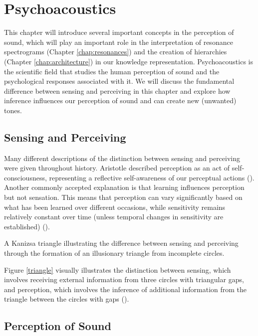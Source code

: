 \chapter{Psychoacoustics}
\label{chap:Psychoacoustics}
This chapter will introduce several important concepts in the perception of sound, which will play an important role in the interpretation of resonance spectrograms (Chapter \ref{chap:resonances}) and the creation of hierarchies (Chapter \ref{chap:architecture}) in our knowledge representation. 
Psychoacoustics is the scientific field that studies the human perception of sound and the psychological responses associated with it. We will discuss the fundamental difference between sensing and perceiving in this chapter and explore how inference influences our perception of sound and can create new (unwanted) tones.


\section{Sensing and Perceiving}
Many different descriptions of the distinction between sensing and perceiving were given throughout history.
Aristotle described perception as an act of self-consciousness, representing a reflective self-awareness of our perceptual actions (\cite{kosman_perceiving_1975}).
Another commonly accepted explanation is that learning influences perception but not sensation. This means that perception can vary significantly based on what has been learned over different occasions, while sensitivity remains relatively constant over time (unless temporal changes in sensitivity are established) (\cite{obrien_epistemology_nodate}).  
\begin{marginfigure}
\centering

\vspace{0.5cm}
\caption{A Kanizsa triangle illustrating the difference between sensing and perceiving through the formation of an illusionary triangle from incomplete circles.}
\label{triangle} 
\end{marginfigure} 
Figure \ref{triangle} visually illustrates the distinction between sensing, which involves receiving external information from three circles with triangular gaps, and perception, which involves the inference of additional information from the triangle between the circles with gaps (\cite{kellman_theory_1991}).


\section{Perception of Sound}
